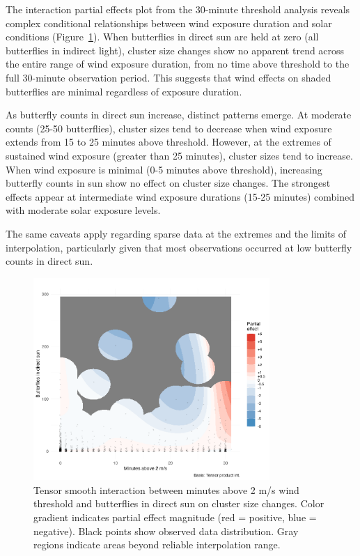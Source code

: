 

The interaction partial effects plot from the 30-minute threshold analysis reveals complex conditional relationships between wind exposure duration and solar conditions (Figure~\ref{fig:threshold_interaction}). When butterflies in direct sun are held at zero (all butterflies in indirect light), cluster size changes show no apparent trend across the entire range of wind exposure duration, from no time above threshold to the full 30-minute observation period. This suggests that wind effects on shaded butterflies are minimal regardless of exposure duration.

As butterfly counts in direct sun increase, distinct patterns emerge. At moderate counts (25-50 butterflies), cluster sizes tend to decrease when wind exposure extends from 15 to 25 minutes above threshold. However, at the extremes of sustained wind exposure (greater than 25 minutes), cluster sizes tend to increase. When wind exposure is minimal (0-5 minutes above threshold), increasing butterfly counts in sun show no effect on cluster size changes. The strongest effects appear at intermediate wind exposure durations (15-25 minutes) combined with moderate solar exposure levels.

The same caveats apply regarding sparse data at the extremes and the limits of interpolation, particularly given that most observations occurred at low butterfly counts in direct sun.

\begin{figure}[htbp]
    \centering
    \includegraphics[width=0.8\textwidth]{supplemental/results/30_min_threshold/figures/interaction_wind_x_sun_binned.png}
    \caption{Tensor smooth interaction between minutes above 2 m/s wind threshold and butterflies in direct sun on cluster size changes. Color gradient indicates partial effect magnitude (red = positive, blue = negative). Black points show observed data distribution. Gray regions indicate areas beyond reliable interpolation range.}
    \label{fig:threshold_interaction}
\end{figure} 

